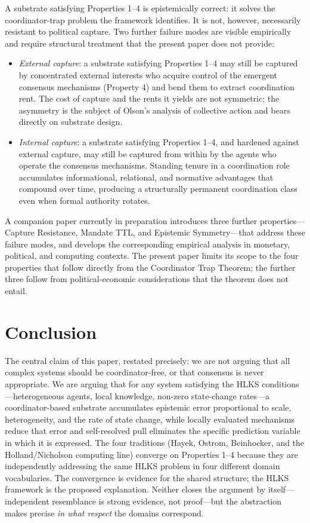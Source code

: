 \documentclass[11pt]{article}
\theoremstyle{definition}
\theoremstyle{plain}
\theoremstyle{plain}
\begin{document}
A substrate satisfying Properties 1--4 is epistemically correct: it solves
the coordinator-trap problem the framework identifies. It is not, however,
necessarily resistant to political capture. Two further failure modes are
visible empirically and require structural treatment that the present paper
does not provide:
\begin{itemize}
\item \emph{External capture}: a substrate satisfying Properties 1--4 may
  still be captured by concentrated external interests who acquire control of
  the emergent consensus mechanisms (Property 4) and bend them to extract
  coordination rent. The cost of capture and the rents it yields are not
  symmetric; the asymmetry is the subject of Olson's analysis of collective
  action and bears directly on substrate design.
\item \emph{Internal capture}: a substrate satisfying Properties 1--4, and
  hardened against external capture, may still be captured from within by the
  agents who operate the consensus mechanisms. Standing tenure in a
  coordination role accumulates informational, relational, and normative
  advantages that compound over time, producing a structurally permanent
  coordination class even when formal authority rotates.
\end{itemize}
A companion paper currently in preparation introduces three further
properties---Capture Resistance, Mandate TTL, and Epistemic Symmetry---that
address these failure modes, and develops the corresponding empirical
analysis in monetary, political, and computing contexts. The present paper
limits its scope to the four properties that follow directly from the
Coordinator Trap Theorem; the further three follow from political-economic
considerations that the theorem does not entail.

\section{Conclusion}

The central claim of this paper, restated precisely: we are not arguing that
all complex systems should be coordinator-free, or that consensus is never
appropriate. We are arguing that for any system satisfying the HLKS
conditions---heterogeneous agents, local knowledge, non-zero state-change
rates---a coordinator-based substrate accumulates epistemic error
proportional to scale, heterogeneity, and the rate of state change, while
locally evaluated mechanisms reduce that error and self-resolved pull eliminates
the specific prediction variable in which it is expressed. The four traditions
(Hayek, Ostrom, Beinhocker, and the Holland/Nicholson computing line)
converge on Properties 1--4 because they are independently addressing the same
HLKS problem in four different domain vocabularies. The convergence is evidence
for the shared structure; the HLKS framework is the proposed explanation. Neither
closes the argument by itself---independent resemblance is strong evidence, not
proof---but the abstraction makes precise \emph{in what respect} the domains
correspond.
\end{document}
